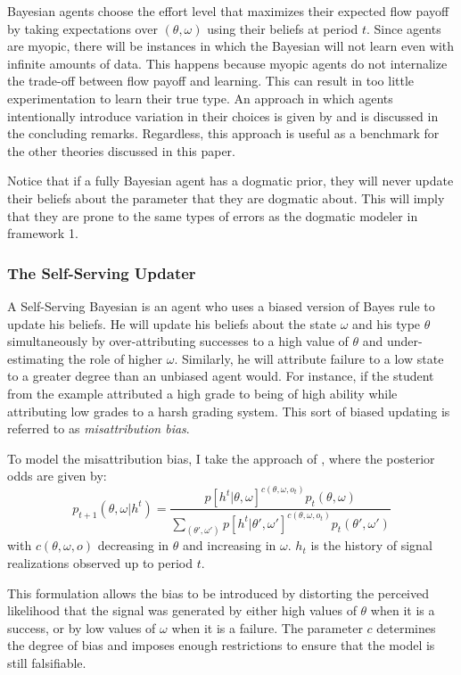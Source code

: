 \documentclass[
  12pt,
]{article}
\begin{document}
Bayesian agents choose the effort level that maximizes their expected
flow payoff by taking expectations over \((\theta, \omega)\) using their
beliefs at period \(t\). Since agents are myopic, there will be
instances in which the Bayesian will not learn even with infinite
amounts of data. This happens because myopic agents do not internalize
the trade-off between flow payoff and learning. This can result in too
little experimentation to learn their true type. An approach in which
agents intentionally introduce variation in their choices is given by
\citet{Hestermann2021} and is discussed in the concluding remarks.
Regardless, this approach is useful as a benchmark for the other
theories discussed in this paper.

Notice that if a fully Bayesian agent has a dogmatic prior, they will
never update their beliefs about the parameter that they are dogmatic
about. This will imply that they are prone to the same types of errors
as the dogmatic modeler in framework 1.

\hypertarget{the-self-serving-updater}{%
\subsubsection{The Self-Serving
Updater}\label{the-self-serving-updater}}

A Self-Serving Bayesian is an agent who uses a biased version of Bayes
rule to update his beliefs. He will update his beliefs about the state
\(\omega\) and his type \(\theta\) simultaneously by over-attributing
successes to a high value of \(\theta\) and under-estimating the role of
higher \(\omega\). Similarly, he will attribute failure to a low state
to a greater degree than an unbiased agent would. For instance, if the
student from the example attributed a high grade to being of high
ability while attributing low grades to a harsh grading system. This
sort of biased updating is referred to as \emph{misattribution bias}.

To model the misattribution bias, I take the approach of
\citet{benjamin2019}, where the posterior odds are given by: \[
p_{t+1}(\theta, \omega| h^t) = \frac{p[h^t|\theta, \omega]^{c(\theta, \omega, o_t)}p_t(\theta, \omega)}{\sum_{(\theta', \omega')}p[h^t|\theta', \omega']^{c(\theta, \omega, o_t)}p_t(\theta', \omega')}
\] with \(c(\theta, \omega, o)\) decreasing in \(\theta\) and increasing
in \(\omega\). \(h_t\) is the history of signal realizations observed up
to period \(t\).

This formulation allows the bias to be introduced by distorting the
perceived likelihood that the signal was generated by either high values
of \(\theta\) when it is a success, or by low values of \(\omega\) when
it is a failure. The parameter \(c\) determines the degree of bias and
imposes enough restrictions to ensure that the model is still
falsifiable.
\end{document}
